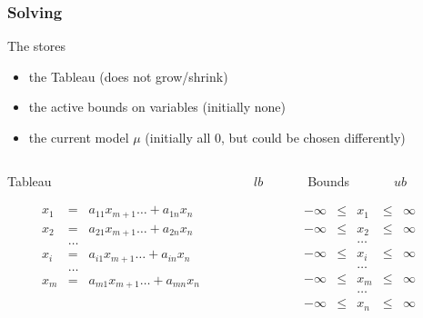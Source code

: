 \begin{frame}
  \frametitle{Solving}

  \scriptsize

  The \tsolver stores 
  \begin{itemize}
    \item the Tableau (does not grow/shrink)
    \item the active bounds on variables (initially none)
    \item the current model $\mu$ (initially all $0$, but could be chosen differently)
  \end{itemize}

  \vfill

  \begin{columns}

  \begin{column}{.4\textwidth}
  \begin{center}
  Tableau
  \end{center}
  $$
  \begin{array}{rcl}
    x_1 & = & a_{11} x_{m+1} \ldots + a_{1n} x_n  \\ 
    x_2 & = & a_{21} x_{m+1} \ldots + a_{2n} x_n  \\ 
    & \ldots \\                             
    x_i & = & a_{i1} x_{m+1} \ldots + a_{in} x_n  \\ 
    & \ldots \\                             
    x_m & = & a_{m1} x_{m+1} \ldots + a_{mn} x_n \\
    \\
    \\
  \end{array}
  $$
  \end{column}

  \begin{column}{.3\textwidth}
  \begin{center}
  $lb$~~~~~~~Bounds~~~~~~~$ub$
  \end{center}
  $$
  \begin{array}{rcccl}
    - \infty & \leq & x_1 & \leq & \infty \\
    - \infty & \leq & x_2 & \leq & \infty \\
    & & \ldots & & \\
    - \infty & \leq & x_i & \leq & \infty \\
    & & \ldots & & \\
    - \infty & \leq & x_m & \leq & \infty \\
    & & \ldots & & \\
    - \infty & \leq & x_n & \leq & \infty \\
  \end{array}
  $$
  \end{column}


\end{columns}
\end{frame}
